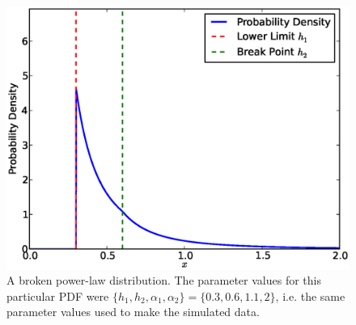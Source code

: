 \documentclass[manuscript]{aastex}
\begin{document}
\begin{figure}[h!]
\begin{center}
\includegraphics[scale=0.5]{Figures/broken.eps}
\caption{A broken power-law distribution. The parameter values for this
particular PDF were
$\{h_1, h_2, \alpha_1, \alpha_2\} = \{0.3, 0.6, 1.1, 2\}$, i.e. the same
parameter values used to make the simulated data.
\label{fig:powerlaw}}
\end{center}
\end{figure}


\end{document}
